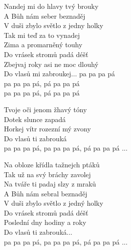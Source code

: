 
\ve{}
Nandej mi do hlavy tvý brouky\\
A Bůh nám seber beznaděj\\
V duši zbylo světlo z jedny holky\\
Tak mi teď za to vynadej\\
Zima a promarněný touhy\\
Do vrásek stromů padá déšť\\
Zbejvaj roky asi ne moc dlouhý\\
Do vlasů mi zabroukej... pa pa pa pá\\
pa pa pa pá, pá pa pa pá\\
pa pa pa pá, pá pa pa pá
 
\ve{}
Tvoje oči jenom žhavý tóny\\
Dotek slunce zapadá\\
Horkej vítr rozezní mý zvony\\
Do vlasů ti zabrouká\\
pa pa pa pá, pa pa pa pá, pá pa pa pá ...

\ve{}
Na obloze křídla tažnejch ptáků\\
Tak už na svý bráchy zavolej\\
Na tváře ti padaj slzy z mraků\\
A Bůh nám sebral beznaděj\\
V duši zbylo světlo z jedný holky\\
Do vrásek stromů padá déšť\\
Poslední dny hodiny a roky\\
Do vlasů ti zabrouká...\\
pa pa pa pá, pa pa pa pá, pá pa pa pá ...

\esong{}